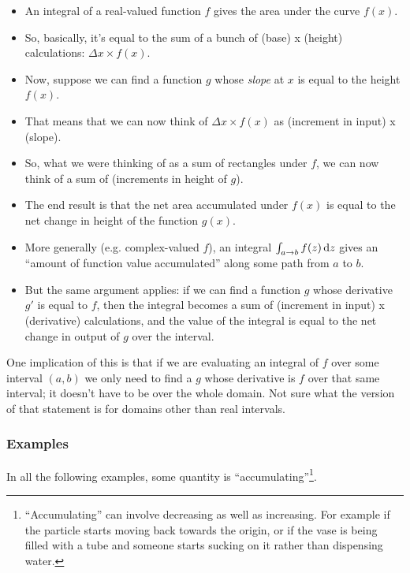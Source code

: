 \begin{itemize}
\item An integral of a real-valued function $f$ gives the area under the curve $f(x)$.
\item So, basically, it's equal to the sum of a bunch of (base) x (height) calculations: $\Delta x \times f(x)$.
\item Now, suppose we can find a function $g$ whose \textit{slope} at $x$ is equal to the height $f(x)$.
\item That means that we can now think of $\Delta x \times f(x)$ as (increment in input) x (slope).
\item So, what we were thinking of as a sum of rectangles under $f$, we can now think of a sum of
  (increments in height of $g$).
\item The end result is that the net area accumulated under $f(x)$ is equal to the net change in height of
  the function $g(x)$.
\item More generally (e.g. complex-valued $f$), an integral $\int_{a \to b} f(z) \dz$ gives an ``amount of
  function value accumulated'' along some path from $a$ to $b$.
\item But the same argument applies: if we can find a function $g$ whose derivative $g'$ is equal to
  $f$, then the integral becomes a sum of (increment in input) x (derivative) calculations, and the
  value of the integral is equal to the net change in output of $g$ over the interval.
\end{itemize}

One implication of this is that if we are evaluating an integral of $f$ over some interval $(a, b)$ we
only need to find a $g$ whose derivative is $f$ over that same interval; it doesn't have to be over the
whole domain. Not sure what the version of that statement is for domains other than real intervals.
\subsubsection*{Examples}

In all the following examples, some quantity is
``accumulating''\footnote{``Accumulating'' can involve decreasing as well as
  increasing. For example if the particle starts moving back towards the
  origin, or if the vase is being filled with a tube and someone starts sucking
  on it rather than dispensing water.}.


